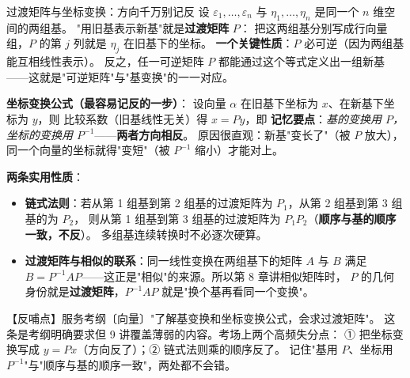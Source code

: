 
\begin{fdeep}{过渡矩阵与坐标变换：方向千万别记反}
设 $\varepsilon_1,\dots,\varepsilon_n$ 与 $\eta_1,\dots,\eta_n$ 是同一个 $n$ 维空间的两组基。
"用旧基表示新基"就是\textbf{过渡矩阵} $P$：
把这两组基分别写成行向量组，$P$ 的第 $j$ 列就是 $\eta_j$ 在旧基下的坐标。
\textbf{一个关键性质}：$P$ 必可逆（因为两组基能互相线性表示）。
反之，任一可逆矩阵 $P$ 都能通过这个等式定义出一组新基——这就是"可逆矩阵"与"基变换"的一一对应。

\medskip
\textbf{坐标变换公式（最容易记反的一步）}：
设向量 $\alpha$ 在旧基下坐标为 $x$、在新基下坐标为 $y$，则
比较系数（旧基线性无关）得 $x=Py$，即
\textbf{记忆要点}：\emph{基的变换用 $P$，坐标的变换用 $P^{-1}$}——\textbf{两者方向相反}。
原因很直观：新基"变长了"（被 $P$ 放大），同一个向量的坐标就得"变短"（被 $P^{-1}$ 缩小）才能对上。

\textbf{两条实用性质}：
\begin{itemize}[leftmargin=2.2em,itemsep=0.22em]
\item \textbf{链式法则}：若从第 1 组基到第 2 组基的过渡矩阵为 $P_1$，从第 2 组基到第 3 组基的为 $P_2$，
      则从第 1 组基到第 3 组基的过渡矩阵为 $P_1P_2$（\textbf{顺序与基的顺序一致，不反}）。
      多组基连续转换时不必逐次硬算。
\item \textbf{过渡矩阵与相似的联系}：同一线性变换在两组基下的矩阵 $A$ 与 $B$ 满足
      $B=P^{-1}AP$——这正是"相似"的来源。所以第 8 章讲相似矩阵时，
      $P$ 的几何身份就是\textbf{过渡矩阵}，$P^{-1}AP$ 就是"换个基再看同一个变换"。
\end{itemize}
【反哺点】服务考纲〔向量〕"了解基变换和坐标变换公式，会求过渡矩阵"。
这条是考纲明确要求但 9 讲覆盖薄弱的内容。考场上两个高频失分点：
① 把坐标变换写成 $y=Px$（方向反了）；② 链式法则乘的顺序反了。
记住"基用 $P$、坐标用 $P^{-1}$"与"顺序与基的顺序一致"，两处都不会错。
\end{fdeep}

